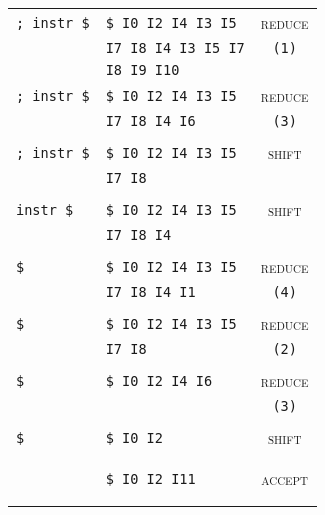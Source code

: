 \documentclass[a4paper,10pt]{article}
\begin{document}
\begin{enumerate}
\begin{enumerate}
\begin{center}
\begin{tabular}{ | l | l | c |}
                    \verb|; instr $| & \verb|$ I0 I2 I4 I3 I5| & \textsc{reduce} \\
                    & \verb|I7 I8 I4 I3 I5 I7| & \verb|(1)|\\
                    & \verb|I8 I9 I10| & \\ \hline

                    \verb|; instr $| & \verb|$ I0 I2 I4 I3 I5| & \textsc{reduce} \\
                    & \verb|I7 I8 I4 I6| & \verb|(3)| \\
                    & & \\ \hline

                    \verb|; instr $| & \verb|$ I0 I2 I4 I3 I5| & \textsc{shift} \\
                    & \verb|I7 I8| &  \\
                    & & \\ \hline

                    \verb|instr $| & \verb|$ I0 I2 I4 I3 I5| & \textsc{shift} \\
                    & \verb|I7 I8 I4| &  \\
                    & & \\ \hline

                    \verb|$| & \verb|$ I0 I2 I4 I3 I5| & \textsc{reduce} \\
                    & \verb|I7 I8 I4 I1| &  \verb|(4)|\\
                    & & \\ \hline

                    \verb|$| & \verb|$ I0 I2 I4 I3 I5| & \textsc{reduce} \\
                    & \verb|I7 I8| &  \verb|(2)|\\
                    & & \\ \hline

                    \verb|$| & \verb|$ I0 I2 I4 I6| & \textsc{reduce} \\
                    &  &  \verb|(3)|\\
                    & & \\ \hline

                    \verb|$| & \verb|$ I0 I2| & \textsc{shift} \\
                    &  & \\
                    & & \\ \hline

                    & \verb|$ I0 I2 I11| & \textsc{accept} \\
                    &  &  \\
                    & & \\ \hline
                \end{tabular}
            \end{center}


\end{enumerate}
\end{enumerate}
\end{document}
